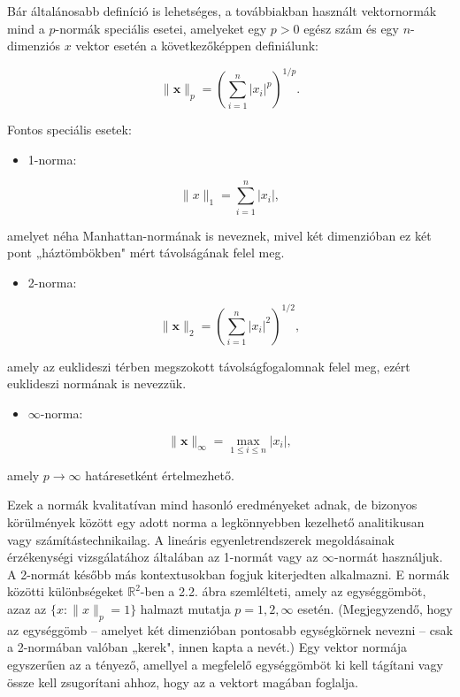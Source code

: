 \documentclass[
  magyar,
  11pt]{article}
\providecommand{\tightlist}{%
  \setlength{\itemsep}{0pt}\setlength{\parskip}{0pt}}
\providecommand{\boldsymbol}[1]{\mathbf{#1}}
\begin{document}
Bár általánosabb definíció is lehetséges, a továbbiakban használt
vektornormák mind a \(p\)-normák speciális esetei, amelyeket egy
\(p > 0\) egész szám és egy \(n\)-dimenziós \(x\) vektor esetén a
következőképpen definiálunk:

\[\|\boldsymbol{x}\|_p = \left(\sum_{i=1}^n |x_i|^p\right)^{1/p}.\]

Fontos speciális esetek:

\begin{itemize}
\tightlist
\item
  1-norma:
\end{itemize}

\[\|x\|_1 = \sum_{i=1}^n |x_i|,\]

amelyet néha Manhattan-normának is neveznek, mivel két dimenzióban ez
két pont „háztömbökben" mért távolságának felel meg.

\begin{itemize}
\tightlist
\item
  2-norma:
\end{itemize}

\[\|\boldsymbol{x}\|_2 = \left(\sum_{i=1}^n |x_i|^2\right)^{1/2},\]

amely az euklideszi térben megszokott távolságfogalomnak felel meg,
ezért euklideszi normának is nevezzük.

\begin{itemize}
\tightlist
\item
  \(\infty\)-norma:
\end{itemize}

\[\|\boldsymbol{x}\|_{\infty} = \max_{1 \le i \le n} |x_i|,\]

amely \(p \to \infty\) határesetként értelmezhető.

Ezek a normák kvalitatívan mind hasonló eredményeket adnak, de bizonyos
körülmények között egy adott norma a legkönnyebben kezelhető
analitikusan vagy számítástechnikailag. A lineáris egyenletrendszerek
megoldásainak érzékenységi vizsgálatához általában az 1-normát vagy az
\(\infty\)-normát használjuk. A 2-normát később más kontextusokban
fogjuk kiterjedten alkalmazni. E normák közötti különbségeket
\(\mathbb{R}^2\)-ben a 2.2. ábra szemlélteti, amely az egységgömböt,
azaz az \(\{x : \|x\|_p = 1\}\) halmazt mutatja \(p = 1, 2, \infty\)
esetén. (Megjegyzendő, hogy az egységgömb -- amelyet két dimenzióban
pontosabb egységkörnek nevezni -- csak a 2-normában valóban „kerek",
innen kapta a nevét.) Egy vektor normája egyszerűen az a tényező,
amellyel a megfelelő egységgömböt ki kell tágítani vagy össze kell
zsugorítani ahhoz, hogy az a vektort magában foglalja.
\end{document}
